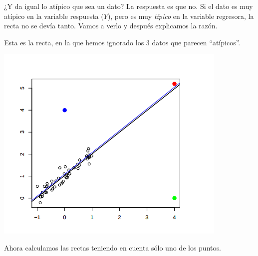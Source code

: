 \begin{example}

¿Y da igual lo atípico que sea un dato? La respuesta es que no. Si el dato es muy atípico en la variable respuesta ($Y$), pero es muy \textit{típico} en la variable regresora, la recta no se devía tanto. Vamos a verlo y después explicamos la razón.

Esta es la recta, en la que hemos ignorado los 3 datos que parecen ``atípicos''.
\begin{center}
\includegraphics[scale=0.9]{img/sobredistanciahorizontal1.png}
\end{center}

Ahora calculamos las rectas teniendo en cuenta sólo uno de los puntos.


\end{example}
